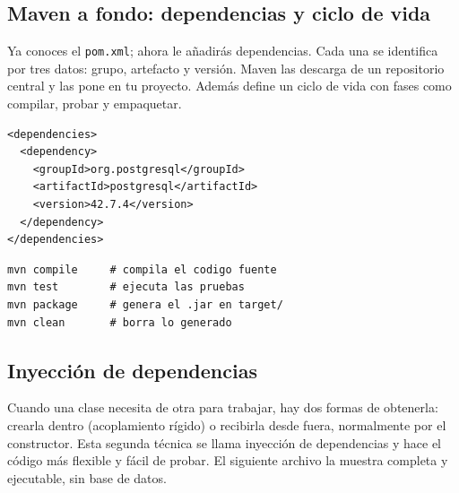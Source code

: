 \documentclass[11pt]{article}
\begin{document}
\subsection{Maven a fondo: dependencias y ciclo de vida}
Ya conoces el \texttt{pom.\allowbreak{}xml}; ahora le añadirás dependencias. Cada una se identifica por tres datos: grupo, artefacto y versión. Maven las descarga de un repositorio central y las pone en tu proyecto. Además define un ciclo de vida con fases como compilar, probar y empaquetar.

\begin{cajacodigo}
\begin{lstlisting}[style=xml]
<dependencies>
  <dependency>
    <groupId>org.postgresql</groupId>
    <artifactId>postgresql</artifactId>
    <version>42.7.4</version>
  </dependency>
</dependencies>
\end{lstlisting}
\end{cajacodigo}
\vspace{2pt}
\begin{cajacodigo}
\begin{lstlisting}[style=markup]
mvn compile     # compila el codigo fuente
mvn test        # ejecuta las pruebas
mvn package     # genera el .jar en target/
mvn clean       # borra lo generado
\end{lstlisting}
\end{cajacodigo}
\vspace{2pt}
\subsection{Inyección de dependencias}
Cuando una clase necesita de otra para trabajar, hay dos formas de obtenerla: crearla dentro (acoplamiento rígido) o recibirla desde fuera, normalmente por el constructor. Esta segunda técnica se llama inyección de dependencias y hace el código más flexible y fácil de probar. El siguiente archivo la muestra completa y ejecutable, sin base de datos.
\end{document}
